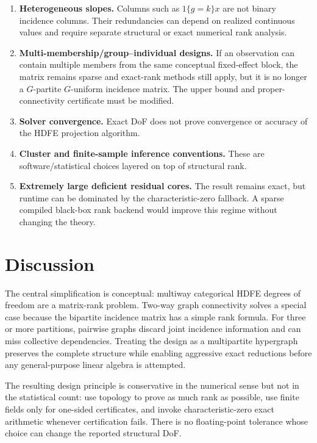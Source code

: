 \documentclass[11pt]{article}
\theoremstyle{definition}
\newcommand{\1}{\mathbf{1}}
\begin{document}
\begin{enumerate}[label=(\roman*)]
  \item \textbf{Heterogeneous slopes.} Columns such as $1\{g=k\}x$ are not binary incidence columns. Their redundancies can depend on realized continuous values and require separate structural or exact numerical rank analysis.
  \item \textbf{Multi-membership/group--individual designs.} If an observation can contain multiple members from the same conceptual fixed-effect block, the matrix remains sparse and exact-rank methods still apply, but it is no longer a $G$-partite $G$-uniform incidence matrix. The upper bound and proper-connectivity certificate must be modified.
  \item \textbf{Solver convergence.} Exact DoF does not prove convergence or accuracy of the HDFE projection algorithm.
  \item \textbf{Cluster and finite-sample inference conventions.} These are software/statistical choices layered on top of structural rank.
  \item \textbf{Extremely large deficient residual cores.} The result remains exact, but runtime can be dominated by the characteristic-zero fallback. A sparse compiled black-box rank backend would improve this regime without changing the theory.
\end{enumerate}

\section{Discussion}

The central simplification is conceptual: multiway categorical HDFE degrees of freedom are a matrix-rank problem. Two-way graph connectivity solves a special case because the bipartite incidence matrix has a simple rank formula. For three or more partitions, pairwise graphs discard joint incidence information and can miss collective dependencies. Treating the design as a multipartite hypergraph preserves the complete structure while enabling aggressive exact reductions before any general-purpose linear algebra is attempted.

The resulting design principle is conservative in the numerical sense but not in the statistical count: use topology to prove as much rank as possible, use finite fields only for one-sided certificates, and invoke characteristic-zero exact arithmetic whenever certification fails. There is no floating-point tolerance whose choice can change the reported structural DoF.
\end{document}
